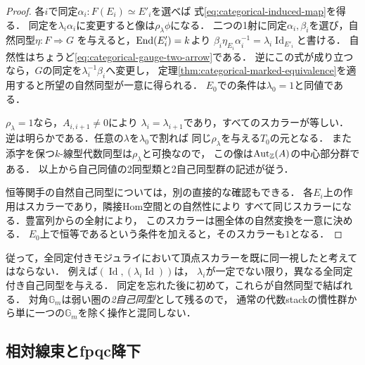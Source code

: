 \begin{proof}
各$i$で同定$\alpha_i:F(E_i)\simeq E'_i$を選べば
式\eqref{eq:categorical-induced-map}を得る．
同定を$\lambda_i\alpha_i$に変更すると像は$\rho_\lambda\phi$になる．
二つの1射に同定$\alpha_i,\beta_i$を選び，自然同型$\eta:F\Rightarrow G$
を与えると，$\operatorname{End}(E'_i)=k$より
$\beta_i\eta_{E_i}\alpha_i^{-1}=\lambda_i\operatorname{Id}_{E'_i}$と書ける．
自然性はちょうど\eqref{eq:categorical-gauge-two-arrow}である．
逆にこの式が成り立つなら，$G$の同定を$\lambda_i^{-1}\beta_i$へ変更し，
定理\ref{thm:categorical-marked-equivalence}を適用すると所望の自然同型が一意に得られる．
$E_0$での条件は$\lambda_0=1$と同値である．

$\rho_\lambda=1$なら，$A_{i,i+1}\ne0$により
$\lambda_i=\lambda_{i+1}$であり，すべてのスカラーが等しい．
逆は明らかである．任意の$\lambda$を$\lambda_0$で割れば
同じ$\rho_\lambda$を与える$T_0$の元となる．
また添字を保つ$k$-線型代数同型は$\rho_\lambda$と可換なので，
この像は$\operatorname{Aut}_{\mathbb Z}(A)$の中心部分群である．
以上から自己同値の2同型類と2自己同型群の記述が従う．

恒等関手の自然自己同型については，別の直接的な確認もできる．
各$E_i$上の作用はスカラーであり，隣接Hom空間との自然性により
すべて同じスカラーになる．豊富列からの全射により，
このスカラーは圏全体の自然変換を一意に決める．
$E_0$上で恒等であるという条件を加えると，そのスカラーも$1$となる．
\end{proof}

従って，全同定付きモジュライにおいて頂点スカラーを既に同一視したと考えてはならない．
例えば$(\operatorname{Id},(\lambda_i\operatorname{Id}))$は，
$\lambda_i$が一定でない限り，異なる全同定付き自己同型を与える．
同定を忘れた後に初めて，これらが自然同型で結ばれる．
対角$\mathbb G_m$は弱い圏の\emph{2自己同型}として残るので，
通常の代数stackの慣性群から単に一つの$\mathbb G_m$を除く操作と混同しない．

\subsection{相対線束とfpqc降下}

